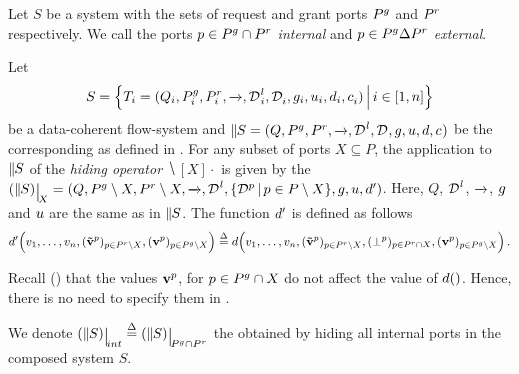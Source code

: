 \begin{definition}
  \label{defn:port:types}
  Let $S$ be a system with the sets of request and grant ports $\pin$ and
  $\pout$ respectively.  We call the ports $p \in \pin \cap \pout$
  \emph{internal} and $p \in \pin \Delta \pout$ \emph{external}.
\end{definition}

\begin{definition}
  \label{defn:data:hiding}
  Let \[S = \Setdef{T_i = (Q_i, \pin_i, \pout_i, \goesto{},
    \local{\data}_i, \data_i, \guard_i, \up_i, \down_i, \combine_i)}{i \in
    [1,n]}\] be a data-coherent flow-system and $\compose[S] = (Q, \pin,
  \pout, \goesto{}, \local{\data}, \data, \guard, \up, \down, \combine)$ be
  the corresponding \datamodel{} as defined in .
  For any subset of ports $X \subseteq P$, the application to $\compose[S]$
  of the \emph{hiding operator} $\hide[X]{\cdot}$ is given by the
  \datamodel{} $\hide[X]{\compose[S]} = (Q, \pin \setminus X, \pout
  \setminus X, \goesto{}, \local{\data}, \setdef{\data[p]}{p \in P
    \setminus X}, \guard, \up, \down')$.  Here, $Q$, $\local{\data}$,
  $\goesto{}$, $\guard$ and $\up$ are the same as in $\compose[S]$.  The
  function $\down'$ is defined as follows
  \begin{equation}
    \label{eq:data:hiding}
    \down'\Big(v_1, \dots, v_n, 
      (\portdata{\tilde{v}}^p)_{p \in \pout \setminus X}, 
      (\portdata{v}^p)_{p \in \pin \setminus X}
    \Big) 
    \bydef{=} 
    \down\Big(v_1, \dots, v_n, 
      (\portdata{\tilde{v}}^p)_{p \in \pout \setminus X}, 
      (\bot^p)_{p \in \pout \cap X},
      (\portdata{v}^p)_{p \in \pin \setminus X}
    \Big)\,.
  \end{equation}

  Recall () that the values $\portdata{v}^p$, for $p \in \pin
  \cap X$ do not affect the value of $\down()$.  Hence, there is no need to
  specify them in .

  We denote $\hide[int]{\compose{S}} \bydef{=} \hide[\pin \cap
    \pout]{\compose{S}}$ the \datamodel{} obtained by hiding all internal
  ports in the composed system $S$.
\end{definition}

